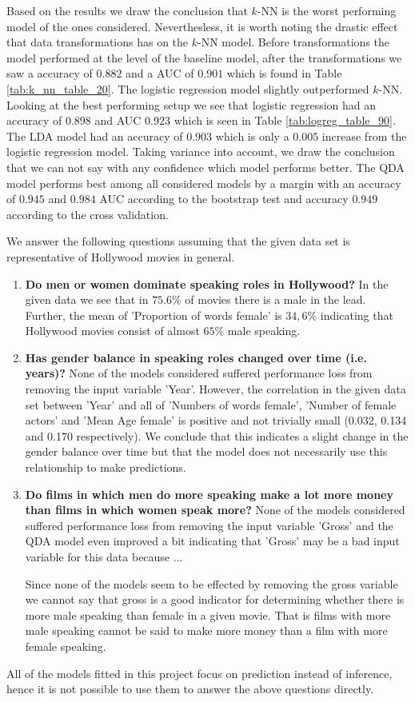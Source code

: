 \documentclass[../../project.tex]{subfiles}
\begin{document}
	Based on the results we draw the conclusion that $k$-NN is the worst performing model of the ones considered. Neverthesless, it is worth noting the drastic effect that data transformations has on the $k$-NN model. Before transformations the model performed at the level of the baseline model, after the transformations we saw a accuracy of $0.882$ and a AUC of $0.901$ which is found in Table \ref{tab:k_nn_table_20}. The logistic regression model slightly outperformed $k$-NN. Looking at the best performing setup we see that logistic regression had an accuracy of $0.898$ and AUC $0.923$ which is seen in Table \ref{tab:logreg_table_90}. The LDA model had an accuracy of $0.903$ which is only a $0.005$ increase from the logistic regression model. Taking variance into account, we draw the conclusion that we can not say with any confidence which model performs better. The QDA model performs best among all considered models by a margin with an accuracy of $0.945$ and $0.984$ AUC according to the bootstrap test and accuracy $0.949$ according to the cross validation.
	
	We answer the following questions assuming that the given data set is representative of Hollywood movies in general.
\begin{enumerate}
    \item \textbf{Do men or women dominate speaking roles in Hollywood?} In the given data we see that in $75.6\%$ of movies there is a male in the lead. Further, the mean of 'Proportion of words female' is $34,6\%$ indicating that Hollywood movies consist of almost $65\%$ male speaking.
    
    \item \textbf{Has gender balance in speaking roles changed over time (i.e. years)?} None of the models considered suffered performance loss from removing the input variable 'Year'. However, the correlation in the given data set between 'Year' and all of 'Numbers of words female', 'Number of female actors' and 'Mean Age female' is positive and not trivially small (0.032, 0.134 and 0.170 respectively). We conclude that this indicates a slight change in the gender balance over time but that the model does not necessarily use this relationship to make predictions.
   
    \item \textbf{Do films in which men do more speaking make a lot more money than films in which women speak more?} None of the models considered suffered performance loss from removing the input variable 'Gross' and the QDA model even improved a bit indicating that 'Gross' may be a bad input variable for this data because ...
    
    Since none of the models seem to be effected by removing the gross variable we cannot say that gross is a good indicator for determining whether there is more male speaking than female in a given movie. That is films with more male speaking cannot be said to make more money than a film with more female speaking.    
\end{enumerate}
	
All of the models fitted in this project focus on prediction instead of inference, hence it is not possible to use them to answer the above questions directly.
	
	
\end{document}
